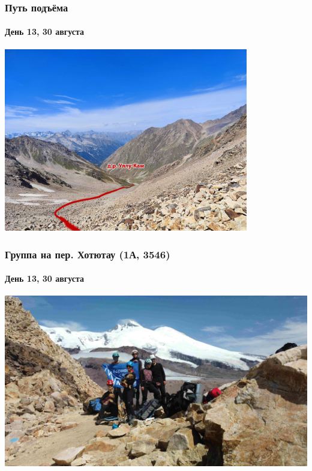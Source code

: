\begin{frame}
	\frametitle{Путь подъёма}
	\framesubtitle{День 13, 30 августа}	
	\centering
	\includegraphics[width=0.8\textwidth]{../pics/IMG_20240830_105443}			
\end{frame}

\begin{frame}
	\frametitle{Группа на пер. Хотютау (1А, 3546)}
	\framesubtitle{День 13, 30 августа}	
	\centering
	\includegraphics[width=\textwidth]{../pics/DJI_0899}			
\end{frame}

